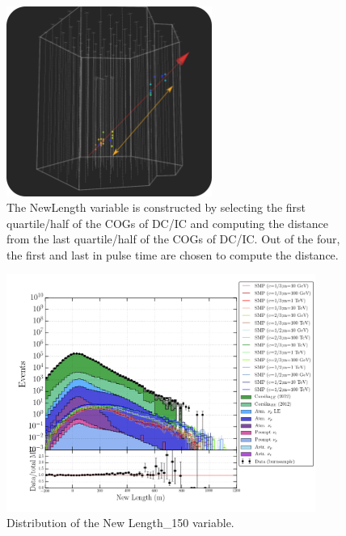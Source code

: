 \begin{figure}
\centering
\includegraphics[width=0.6\textwidth]{chapter8/img/newlengthillustration_extra.png}
\caption{The NewLength variable is constructed by selecting the first quartile/half of the COGs of DC/IC and computing the distance from the last quartile/half of the COGs of DC/IC. Out of the four, the first and last in pulse time are chosen to compute the distance.}
\label{fig:newlength}
\end{figure}
 

\begin{figure}
\centering
\includegraphics[width=0.9\textwidth]{chapter8/img/1D_stack_newlength_150.png}
\caption{Distribution of the New Length\_150 variable.}
\label{fig:newvariablesnewlength}
\end{figure}


